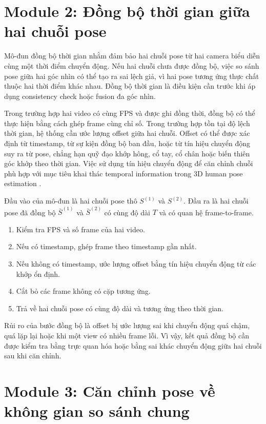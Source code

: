 \documentclass[../DoAn.tex]{subfiles}
\begin{document}
\section{Module 2: Đồng bộ thời gian giữa hai chuỗi pose}
\label{sec:temporal_sync}

Mô-đun đồng bộ thời gian nhằm đảm bảo hai chuỗi pose từ hai camera biểu diễn cùng một thời điểm chuyển động. Nếu hai chuỗi chưa được đồng bộ, việc so sánh pose giữa hai góc nhìn có thể tạo ra sai lệch giả, vì hai pose tương ứng thực chất thuộc hai thời điểm khác nhau. Đồng bộ thời gian là điều kiện cần trước khi áp dụng consistency check hoặc fusion đa góc nhìn.

Trong trường hợp hai video có cùng FPS và được ghi đồng thời, đồng bộ có thể thực hiện bằng cách ghép frame cùng chỉ số. Trong trường hợp tồn tại độ lệch thời gian, hệ thống cần ước lượng offset giữa hai chuỗi. Offset có thể được xác định từ timestamp, từ sự kiện đồng bộ ban đầu, hoặc từ tín hiệu chuyển động suy ra từ pose, chẳng hạn quỹ đạo khớp hông, cổ tay, cổ chân hoặc biến thiên góc khớp theo thời gian. Việc sử dụng tín hiệu chuyển động để căn chỉnh chuỗi phù hợp với mục tiêu khai thác temporal information trong 3D human pose estimation \cite{mtftransformer2023,shin2024wham}.

Đầu vào của mô-đun là hai chuỗi pose thô $S^{(1)}$ và $S^{(2)}$. Đầu ra là hai chuỗi pose đã đồng bộ $\bar{S}^{(1)}$ và $\bar{S}^{(2)}$ có cùng độ dài $T$ và có quan hệ frame-to-frame.

\begin{enumerate}[leftmargin=*, label=\arabic*.]
    \item Kiểm tra FPS và số frame của hai video.
    \item Nếu có timestamp, ghép frame theo timestamp gần nhất.
    \item Nếu không có timestamp, ước lượng offset bằng tín hiệu chuyển động từ các khớp ổn định.
    \item Cắt bỏ các frame không có cặp tương ứng.
    \item Trả về hai chuỗi pose có cùng độ dài và tương ứng theo thời gian.
\end{enumerate}

Rủi ro của bước đồng bộ là offset bị ước lượng sai khi chuyển động quá chậm, quá lặp lại hoặc khi một view có nhiều frame lỗi. Vì vậy, kết quả đồng bộ cần được kiểm tra bằng trực quan hóa hoặc bằng sai khác chuyển động giữa hai chuỗi sau khi căn chỉnh.

\section{Module 3: Căn chỉnh pose về không gian so sánh chung}
\label{sec:pose_alignment}
\end{document}
